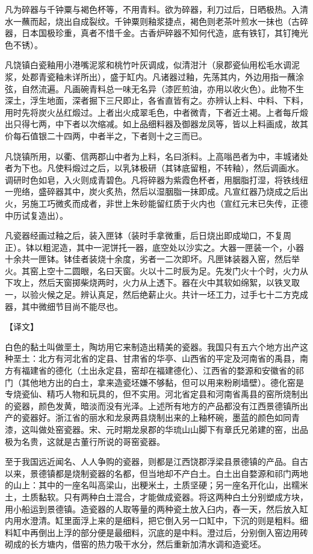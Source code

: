 \documentclass[12pt,UTF8]{ctexbook}
\begin{document}
凡为碎器与千钟粟与褐色杯等，不用青料。欲为碎器，利刀过后，日晒极热。入清水一蘸而起，烧出自成裂纹。千钟粟则釉浆捷点，褐色则老茶叶煎水一抹也（古碎器，日本国极珍重，真者不惜千金。古香炉碎器不知何代造，底有铁钉，其钉掩光色不锈）。

凡饶镇白瓷釉用小港嘴泥浆和桃竹叶灰调成，似清泔汁（泉郡瓷仙用松毛水调泥浆，处郡青瓷釉未详所出），盛于缸内。凡诸器过釉，先荡其内，外边用指一蘸涂弦，自然流遍。凡画碗青料总一味无名异（漆匠煎油，亦用以收火色）。此物不生深土，浮生地面，深者掘下三尺即止，各省直皆有之。亦辨认上料、中料、下料，用时先将炭火丛红煅过。上者出火成翠毛色，中者微青，下者近土褐。上者每斤煅出只得七两，中下者以次缩减。如上品细料器及御器龙凤等，皆以上料画成，故其价每石值银二十四两，中者半之，下者则十之三而已。

凡饶镇所用，以衢、信两郡山中者为上料，名曰浙料。上高嗡邑者为中，丰城诸处者为下也。凡使料煅过之后，以乳钵极研（其钵底留粗，不转釉），然后调画水。调研时色如皂，入火则成青碧色。凡将碎器为紫霞色杯者，用胭脂打湿，将铁线纽一兜络，盛碎器其中，炭火炙热，然后以湿胭脂一抹即成。凡宣红器乃烧成之后出火，另施工巧微炙而成者，非世上朱砂能留红质于火内也（宣红元末已失传，正德中历试复造出）。

凡瓷器经画过釉之后，装入匣钵（装时手拿微重，后日烧出即成坳口，不复周正）。钵以粗泥造，其中一泥饼托一器，底空处以沙实之。大器一匣装一个，小器十余共一匣钵。钵佳者装烧十余度，劣者一二次即坏。凡匣钵装器入窑，然后举火。其窑上空十二圆眼，名曰天窗。火以十二时辰为足。先发门火十个时，火力从下攻上，然后天窗掷柴烧两时，火力从上透下。器在火中其软如绵絮，以铁叉取一，以验火候之足。辨认真足，然后绝薪止火。共计一坯工力，过手七十二方克成器，其中微细节目尚不能尽也。

【译文】

白色的黏土叫做垩土，陶坊用它来制造出精美的瓷器。我国只有五六个地方出产这种垩土：北方有河北省的定县、甘肃省的华亭、山西省的平定及河南省的禹县，南方有福建省的德化（土出永定县，窑却在福建德化）、江西省的婺源和安徽省的祁门（其他地方出的白土，拿来造瓷坯嫌不够黏，但可以用来粉刷墙壁）。德化窑是专烧瓷仙、精巧人物和玩具的，但不实用。河北省定县和河南省禹县的窑所烧制出的瓷器，颜色发黄，暗淡而没有光泽。上述所有地方的产品都没有江西景德镇所出产的瓷器好。浙江省的丽水和龙泉两县烧制出来的上釉杯碗，墨蓝的颜色如同青漆，这叫做处窑瓷器。宋、元时期龙泉郡的华琉山山脚下有章氏兄弟建的窑，出品极为名贵，这就是古董行所说的哥窑瓷器。

至于我国远近闻名、人人争购的瓷器，则都是江西饶郡浮梁县景德镇的产品。自古以来，景德镇都是烧制瓷器的名都，但当地却不产白土。白土出自婺源和祁门两地的山上：其中的一座名叫高梁山，出粳米土，土质坚硬；另一座名开化山，出糯米土，土质黏软。只有两种白土混合，才能做成瓷器。将这两种白土分别塑成方块，用小船运到景德镇。造瓷器的人取等量的两种瓷土放入臼内，舂一天，然后放入缸内用水澄清。缸里面浮上来的是细料，把它倒入另一口缸中，下沉的则是粗料。细料缸中再倒出上浮的部分便是最细料，沉底的是中料。澄过后，分别倒入窑边用砖砌成的长方塘内，借窑的热力吸干水分，然后重新加清水调和造瓷坯。
\end{document}
